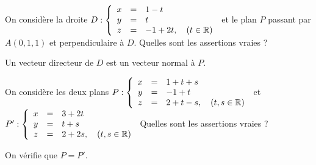 \begin{question} 
On considère la droite $D : \left\{\begin{array}{ccl}x&=&1-t\\y&=&t\\ z&=&-1+2t,\quad (t \in \mathbb{R}) \end{array}\right.$ et le plan $P$  passant par $A(0,1,1)$ et perpendiculaire à $D$.  Quelles sont les assertions vraies ?
\begin{answers}


 
    
    
     
   
\end{answers}
\begin{explanations}
Un vecteur directeur de $D$ est un vecteur normal à $P$.
\end{explanations}

\end{question}


\begin{question} 
On considère les deux plans  $P : \left\{\begin{array}{ccl}x&=&1+t+s\\y&=&-1+t\\ z&=&2+t-s,\quad (t,s  \in \mathbb{R})  \end{array}\right.$ et 
$P': \left\{\begin{array}{ccl}x&=&3+2t\\y&=&t+s\\ z&=&2+2s,\quad (t,s  \in \mathbb{R}) \end{array}\right.$  Quelles sont les assertions vraies ?
\begin{answers}


 
    
    
\end{answers}
\begin{explanations}
On vérifie que $P=P'$.
\end{explanations}

\end{question}



